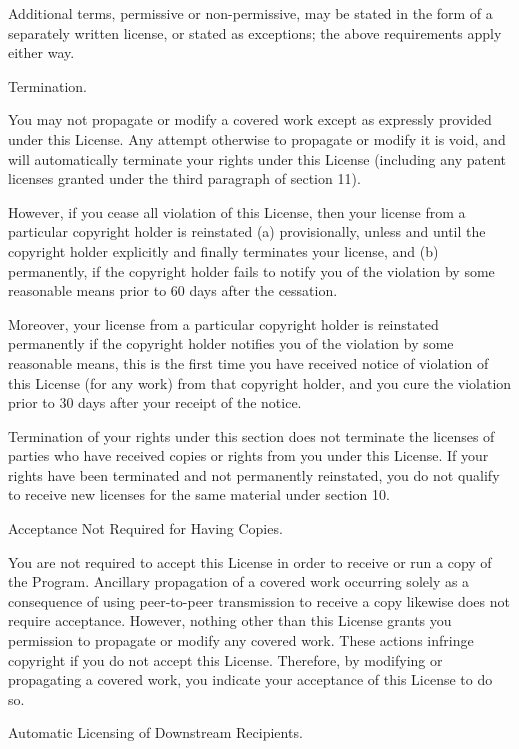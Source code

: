 Additional terms, permissive or non-permissive, may be stated in the form of a separately written license, or stated as exceptions; the above requirements apply either way.

\item Termination.

You may not propagate or modify a covered work except as expressly provided under this License.  Any attempt otherwise to propagate or modify it is void, and will automatically terminate your rights under this License (including any patent licenses granted under the third paragraph of section 11).

However, if you cease all violation of this License, then your license from a particular copyright holder is reinstated (a) provisionally, unless and until the copyright holder explicitly and finally terminates your license, and (b) permanently, if the copyright holder fails to notify you of the violation by some reasonable means prior to 60 days after the cessation.

Moreover, your license from a particular copyright holder is reinstated permanently if the copyright holder notifies you of the violation by some reasonable means, this is the first time you have received notice of violation of this License (for any work) from that copyright holder, and you cure the violation prior to 30 days after your receipt of the notice.

Termination of your rights under this section does not terminate the licenses of parties who have received copies or rights from you under this License.  If your rights have been terminated and not permanently reinstated, you do not qualify to receive new licenses for the same material under section 10.

\item Acceptance Not Required for Having Copies.

You are not required to accept this License in order to receive or run a copy of the Program.  Ancillary propagation of a covered work occurring solely as a consequence of using peer-to-peer transmission to receive a copy likewise does not require acceptance.  However, nothing other than this License grants you permission to propagate or modify any covered work.  These actions infringe copyright if you do not accept this License.  Therefore, by modifying or propagating a covered work, you indicate your acceptance of this License to do so.

\item Automatic Licensing of Downstream Recipients.

